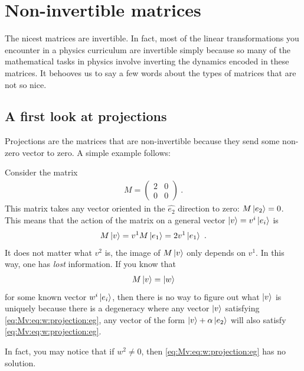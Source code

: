 \documentclass[12pt, oneside]{report}    %
\let\oldsection\section
\def\section{%
  \setcounter{sidenote}{1}%
  \oldsection
}
\begin{document}

\section{Non-invertible matrices}

The nicest matrices are invertible. In fact, most of the linear transformations you encounter in a physics curriculum are invertible simply because so many of the mathematical tasks in physics involve inverting the dynamics encoded in these matrices. It behooves us to say a few words about the types of matrices that are not so nice.

\subsection{A first look at projections}

Projections are the matrices that are non-invertible because they send some non-zero vector to zero. A simple example follows:
\begin{example}
Consider the matrix
\begin{align}
    M = 
    \begin{pmatrix}
        2 & 0 \\
        0 & 0
    \end{pmatrix} \ .
\end{align}
This matrix takes any vector oriented in the $\hat{e_2}$ direction to zero: $M\left|e_2\right\rangle = 0$. This means that the action of the matrix on a general vector $\left|v\right\rangle = v^i\left|e_i\right\rangle$ is
\begin{align}
    M \left|v\right\rangle = v^1 M\left|e_1\right\rangle = 2 v^1 \left|e_1\right\rangle \ .
\end{align}
It does not matter what $v^2$ is, the image of $M\left|v\right\rangle$ only depends on $v^1$. In this way, one has \emph{lost} information. If you know that
\begin{align}
    M\left|v\right\rangle = \left|w\right\rangle
    \label{eq:Mv:eq:w:projection:eg}
\end{align}
for some known vector $w^i\left|e_i\right\rangle$, then there is no way to figure out what $\left|v\right\rangle$ is uniquely because there is a degeneracy where any vector $\left|v\right\rangle$ satisfying \eqref{eq:Mv:eq:w:projection:eg}, any vector of the form $\left|v\right\rangle + \alpha\left|e_2\right\rangle$ will also satisfy \eqref{eq:Mv:eq:w:projection:eg}. 

In fact, you may notice that if $w^2 \neq 0$, then \eqref{eq:Mv:eq:w:projection:eg} has no solution.
\end{example}
\end{document}

